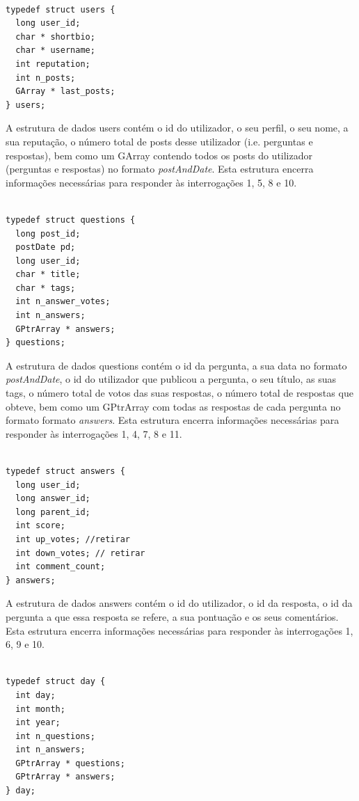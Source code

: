 \documentclass[a4paper]{report}
\begin{document}
\begin{verbatim}

typedef struct users {
  long user_id;
  char * shortbio;
  char * username;
  int reputation;
  int n_posts;
  GArray * last_posts;
} users;

\end{verbatim}

A estrutura de dados users contém o id do utilizador, o seu perfil, o seu nome,
a sua reputação, o número total de posts desse utilizador (i.e. perguntas e respostas),
bem como um GArray contendo todos os posts do utilizador (perguntas e respostas) no
formato \textit{postAndDate}.
Esta estrutura encerra informações necessárias para responder às interrogações 1,
5, 8 e 10.

\begin{verbatim}

typedef struct questions {
  long post_id;
  postDate pd;
  long user_id;
  char * title;
  char * tags;
  int n_answer_votes;
  int n_answers;
  GPtrArray * answers;
} questions;

\end{verbatim}

A estrutura de dados questions contém o id da pergunta, a sua data no formato
\textit{postAndDate}, o id do utilizador que publicou a pergunta, o seu título,
as suas tags, o número total de votos das suas respostas, o número total de
respostas que obteve, bem como um GPtrArray com todas as respostas de cada
pergunta no formato formato \textit{answers}.
Esta estrutura encerra informações necessárias para responder às interrogações 1,
4, 7, 8 e 11.


\begin{verbatim}

typedef struct answers {
  long user_id;
  long answer_id;
  long parent_id;
  int score;
  int up_votes; //retirar
  int down_votes; // retirar
  int comment_count;
} answers;

\end{verbatim}

A estrutura de dados answers contém o id do utilizador, o id da resposta, o id da
pergunta a que essa resposta se refere, a sua pontuação e os seus comentários.
Esta estrutura encerra informações necessárias para responder às interrogações 1,
6, 9 e 10.

\begin{verbatim}

typedef struct day {
  int day;
  int month;
  int year;
  int n_questions;
  int n_answers;
  GPtrArray * questions;
  GPtrArray * answers;
} day;

\end{verbatim}
\end{document}
